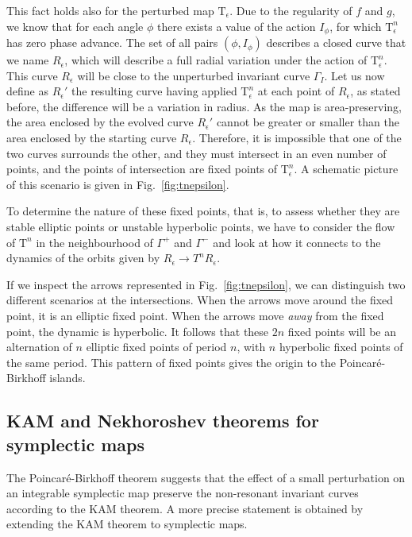 This fact holds also for the perturbed map $\mathrm{T}_\epsilon$. Due to the regularity of $f$ and $g$, we know that for each angle $\phi$ there exists a value of the action $I_\phi$, for which $\mathrm{T}^n_\epsilon$ has zero phase advance. The set of all pairs $(\phi, I_\phi)$ describes a closed curve that we name $R_\epsilon$, which will describe a full radial variation under the action of $\mathrm{T}^n_\epsilon$. This curve $R_\epsilon$ will be close to the unperturbed invariant curve $\Gamma_I$. Let us now define as $R_\epsilon'$ the resulting curve having applied $\mathrm{T}^n_\epsilon$ at each point of $R_\epsilon$, as stated before, the difference will be a variation in radius. As the map is area-preserving, the area enclosed by the evolved curve $R_\epsilon'$ cannot be greater or smaller than the area enclosed by the starting curve $R_\epsilon$. Therefore, it is impossible that one of the two curves surrounds the other, and they must intersect in an even number of points, and the points of intersection are fixed points of $\mathrm{T}^n_\epsilon$. A schematic picture of this scenario is given in Fig.~\ref{fig:tnepsilon}.

To determine the nature of these fixed points, that is, to assess whether they are stable elliptic points or unstable hyperbolic points, we have to consider the flow of $\mathrm{T}^n$ in the neighbourhood of $\Gamma^+$ and $\Gamma^-$ and look at how it connects to the dynamics of the orbits given by $R_\epsilon \to T^n R_\epsilon$.

If we inspect the arrows represented in Fig.~\ref{fig:tnepsilon}, we can distinguish two different scenarios at the intersections. When the arrows move around the fixed point, it is an elliptic fixed point. When the arrows move \textit{away} from the fixed point, the dynamic is hyperbolic. It follows that these $2n$ fixed points will be an alternation of $n$ elliptic fixed points of period $n$, with $n$ hyperbolic fixed points of the same period. This pattern of fixed points gives the origin to the Poincaré-Birkhoff islands.

\subsection{KAM and Nekhoroshev theorems for symplectic maps}

The Poincaré-Birkhoff theorem suggests that the effect of a small perturbation on an integrable symplectic map preserve the non-resonant invariant curves according to the KAM theorem. A more precise statement  is obtained by extending the KAM theorem to symplectic maps.

